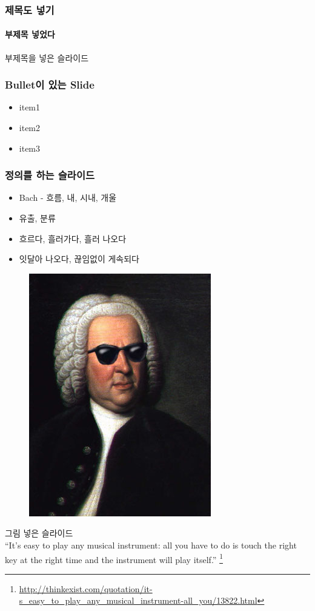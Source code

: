 \documentclass{beamer}
\begin{document}
\begin{frame}
	\frametitle{제목도 넣기}
	\framesubtitle{부제목 넣었다}
	부제목을 넣은 슬라이드
\end{frame}

\begin{frame}
	\frametitle{Bullet이 있는 Slide}
	\begin{itemize}
		\item item1
		\item item2
		\item item3
	\end{itemize}
\end{frame}

\begin{frame}
	\frametitle{정의를 하는 슬라이드}
	\begin{definition}[영어 단어 Stream]
		\begin{itemize}
			\item Bach - 흐름, 내, 시내, 개울
			\item 유출, 분류
			\item 흐르다, 흘러가다, 흘러 나오다
			\item 잇달아 나오다, 끊임없이 게속되다
		\end{itemize}
	\end{definition}
\end{frame}

\begin{frame}
	\begin{figure}
	\includegraphics[width=0.3\columnwidth]{jpg/bach_shades.jpg}
	\end{figure}
	그림 넣은 슬라이드 \\
	``It's easy to play any musical instrument: all you have to do is touch the right key at the right time and the instrument will play itself.''
	\footnote{\url{http://thinkexist.com/quotation/it-s_easy_to_play_any_musical_instrument-all_you/13822.html}}
\end{frame}
\end{document}

